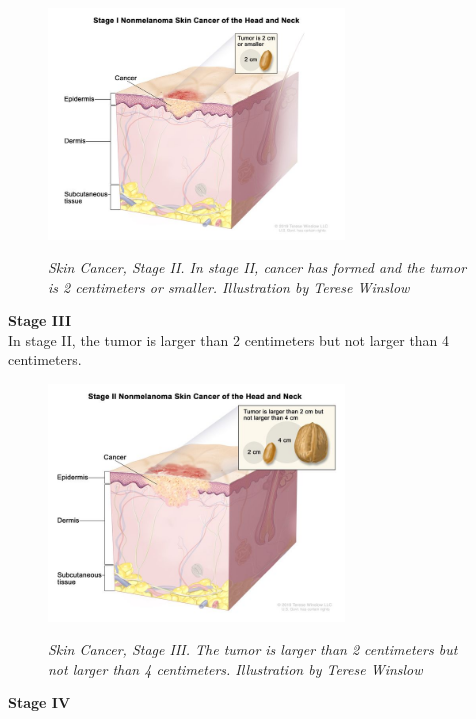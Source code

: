 \begin{figure}[H]
\centering
\includegraphics[width=0.7\textwidth]{imatges/problem_domain/stage1-skin-cancer.jpg}
\caption[Skin Cancer, Stage II]{\textit{Skin Cancer, Stage II. In stage II, cancer has formed and the tumor is 2 centimeters or smaller. Illustration by Terese Winslow}}
{\label{fig:stage1-skin-canceer}}
\end{figure}

\textbf{Stage III} \\

In stage II, the tumor is larger than 2 centimeters but not larger than 4 centimeters.

\begin{figure}[H]
\centering
\includegraphics[width=0.7\textwidth]{imatges/problem_domain/stage2-skin-cancer.jpg}
\caption[Skin Cancer, Stage III]{\textit{Skin Cancer, Stage III. The tumor is larger than 2 centimeters but not larger than 4 centimeters. Illustration by Terese Winslow}}
{\label{fig:stage2-skin-canceer}}
\end{figure}

\textbf{Stage IV} \\

